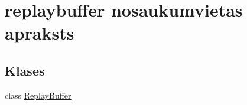 \hypertarget{namespacereplaybuffer}{}\section{replaybuffer nosaukumvietas apraksts}
\label{namespacereplaybuffer}
\subsection*{Klases}
\begin{DoxyCompactItemize}
\item 
class \hyperlink{classreplaybuffer_1_1_replay_buffer}{Replay\+Buffer}
\end{DoxyCompactItemize}
